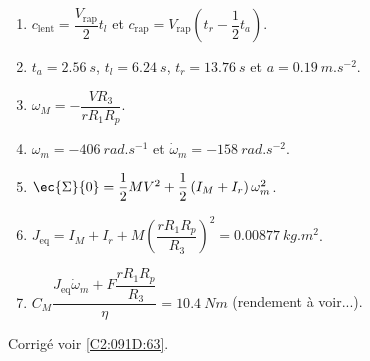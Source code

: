 \else
\footnotesize
\begin{enumerate}
 \item $c_{\text{lent}}=\dfrac{V_{\text{rap}}}{2}t_l$ et $c_{\text{rap}}=V_{\text{rap}}\left(t_r - \dfrac{1}{2}t_a\right)$.
 \item $t_a=\SI{2,56}{s}$, $t_l=\SI{6,24}{s}$, $t_r=\SI{13,76}{s}$ et $a =\SI{0,19}{m.s^{-2}}$. 
 \item $\omega_M = - \dfrac{VR_3}{rR_1R_p}$.
 \item $\omega_m = -\SI{406}{rad.s^{-1}}$ et  $\dot{\omega}_m= -\SI{158}{rad.s^{-2}}$.
 \item $\ec{\Sigma}{0} = \dfrac{1}{2}MV^2 + \dfrac{1}{2}\left( I_M + I_r \right)\omega_m^2$.
 \item $J_{\text{eq}} = I_M + I_r + M \left( \dfrac{rR_1 R_p}{R_3}\right)^2 = \SI{0,00877}{kg.m^2}$.
 \item $C_M \dfrac{J_{\text{eq}} \dot{\omega}_m + F \dfrac{rR_1R_p}{R_3}}{\eta} = \SI{10,4}{Nm}$ (rendement à voir...).
\end{enumerate}
\normalsize

\begin{flushright}
\footnotesize{Corrigé  voir \ref{C2:091D:63}.}
\end{flushright}%
\fi
